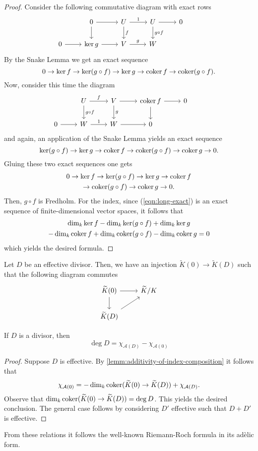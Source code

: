 \begin{proof}
Consider the following commutative diagram with exact rows
\[
	\begin{tikzcd}
	& 0 \ar[r] \ar[d] & U \ar[r, "1"] \ar[d, "f"] & U \ar[r] \ar[d, "g\circ f"] & 0 \\
		0 \ar[r] & \ker g \ar[r] & V \ar[r, "g"] & W & & 
	\end{tikzcd}
\]
By the Snake Lemma we get an exact sequence
\[
	0 \to \ker f \to \ker (g \circ f) \to \ker g \to \operatorname{coker} f \to \operatorname{coker} (g\circ f). 
\]
Now, consider this time the diagram
\[
	\begin{tikzcd}
	& U \ar[r, "f"] \ar[d, "g\circ f"] & V \ar[r] \ar[d, "g"] & \coker f \ar[r] \ar[d] & 0 \\
		0 \ar[r] & W \ar[r, "1"] & W \ar[r] & 0 & & 
	\end{tikzcd}
\]
and again, an application of the Snake Lemma yields an exact sequence
\[
	\ker (g \circ f) \to \ker g \to \operatorname{coker} f \to \operatorname{coker} (g \circ f) \to \operatorname{coker} g \to 0.
\]
Gluing these two exact sequences one gets
\begin{multline}\label{eqn:long-exact}
	0 \to \ker f \to \ker (g \circ f) \to \ker g \to \operatorname{coker} f  \\ \to \operatorname{coker} (g \circ f) \to \operatorname{coker} g \to 0.
\end{multline}
Then, $g \circ f$ is Fredholm. For the index, since (\ref{eqn:long-exact}) is an exact sequence of finite-dimensional vector spaces, it follows that
\begin{multline*}
	\dim_{k}\ker f - \dim_{k}\ker (g \circ f) + \dim_{k}\ker g  \\ - \dim_{k}\operatorname{coker} f + \dim_{k}\operatorname{coker} (g \circ f) - \dim_{k} \operatorname{coker} g = 0
\end{multline*}
which yields the desired formula.
\end{proof}	
Let $D$ be an effective divisor. Then, we have an injection $\widetilde{K}(0) \to \widetilde{K}(D)$ such that the following diagram commutes
\[
	\begin{tikzcd}
		\widetilde{K}(0) \ar[r] \ar[d] & \widetilde{K}/K \\
		\widetilde{K}(D) \ar[ur] &
	\end{tikzcd}
\]
\begin{lemma}\label{lemm:equation-effective-divisors}
	If $D$ is a divisor, then 
	\[
		\deg D =  \chi_{\mathcal{A}(D)} - \chi_{\mathcal{A}(0)}
	\]
\end{lemma}
\begin{proof}
	Suppose $D$ is effective. By \cref{lemm:additivity-of-index-composition} it follows that
	\[
		\chi_{\mathcal{A}(0)} = -\dim_{k}\operatorname{coker}(\widetilde{K}(0) \to \widetilde{K}(D)) + \chi_{\mathcal{A}(D)}.
	\]
	Observe that $\dim_{k}\operatorname{coker}(\widetilde{K}(0) \to \widetilde{K}(D)) = \deg D$. This yields the desired conclusion. The general case follows by considering $D'$ effective such that $D + D'$ is effective.
\end{proof}
From these relations it follows the well-known Riemann-Roch formula in its adèlic form.

